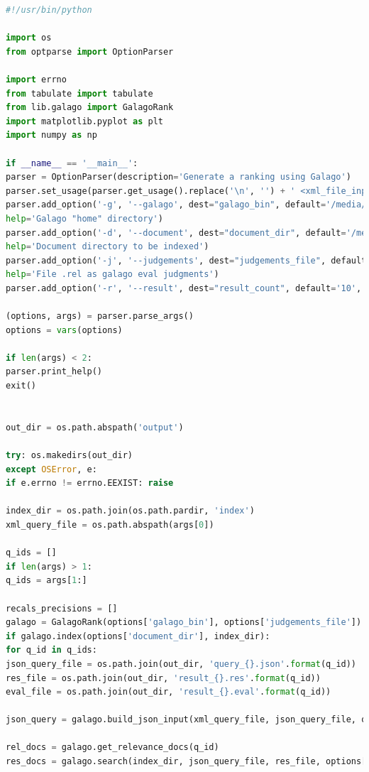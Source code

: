 \documentclass[letterpaper,11pt]{article}
\begin{document}
\begin{lstlisting}[language=python, caption={Code for question 8.4}, label={lst:84}]
#!/usr/bin/python

import os
from optparse import OptionParser

import errno
from tabulate import tabulate
from lib.galago import GalagoRank
import matplotlib.pyplot as plt
import numpy as np

if __name__ == '__main__':
parser = OptionParser(description='Generate a ranking using Galago')
parser.set_usage(parser.get_usage().replace('\n', '') + ' <xml_file_input> [q1 ... qn]')
parser.add_option('-g', '--galago', dest="galago_bin", default='/media/erikaris/DATA/ODU/Semester_3/intro_to_info_retrieval/galago/galago-3.10-bin/bin/galago',
help='Galago "home" directory')
parser.add_option('-d', '--document', dest="document_dir", default='/media/erikaris/DATA/ODU/Semester_3/intro_to_info_retrieval/assignments/a4/code-report/cac',
help='Document directory to be indexed')
parser.add_option('-j', '--judgements', dest="judgements_file", default='/media/erikaris/DATA/ODU/Semester_3/intro_to_info_retrieval/assignments/a4/code-report/cacm.rel',
help='File .rel as galago eval judgments')
parser.add_option('-r', '--result', dest="result_count", default='10', help='Number of result')

(options, args) = parser.parse_args()
options = vars(options)

if len(args) < 2:
parser.print_help()
exit()


out_dir = os.path.abspath('output')

try: os.makedirs(out_dir)
except OSError, e:
if e.errno != errno.EEXIST: raise

index_dir = os.path.join(os.path.pardir, 'index')
xml_query_file = os.path.abspath(args[0])

q_ids = []
if len(args) > 1:
q_ids = args[1:]

recals_precisions = []
galago = GalagoRank(options['galago_bin'], options['judgements_file'])
if galago.index(options['document_dir'], index_dir):
for q_id in q_ids:
json_query_file = os.path.join(out_dir, 'query_{}.json'.format(q_id))
res_file = os.path.join(out_dir, 'result_{}.res'.format(q_id))
eval_file = os.path.join(out_dir, 'result_{}.eval'.format(q_id))

json_query = galago.build_json_input(xml_query_file, json_query_file, q_id)

rel_docs = galago.get_relevance_docs(q_id)
res_docs = galago.search(index_dir, json_query_file, res_file, options['result_count'])


\end{lstlisting}
\end{document}
